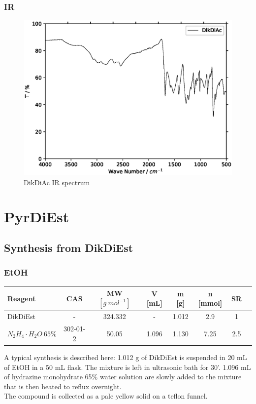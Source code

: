 \documentclass[../Master.tex]{subfiles}
\begin{document}
\newpage
\subsubsection{IR}

\begin{figure}[h!]
	\centering
	\includegraphics[width=12cm,keepaspectratio]{Spectra/ir/DikDiAc.eps}
	\caption{DikDiAc IR spectrum}
\end{figure}

\section{PyrDiEst}
\subsection{Synthesis from DikDiEst}
\subsubsection{EtOH}
\begin{center}
	\begin{tabular}[b]{lccccccc}
		\toprule
		Reagent                      & CAS      & MW \([g \ mol^{-1}]\) & V [mL] & m [g] & n [mmol] & SR  \\
		\midrule
		DikDiEst                     & -        & 324.332               & -      & 1.012 & 2.9      & 1   \\
		\(N_2H_4 \cdot H_2O \ 65\%\) & 302-01-2 & 50.05                 & 1.096  & 1.130 & 7.25     & 2.5 \\
		\bottomrule
	\end{tabular}
\end{center}
A typical synthesis is described here:
1.012 g of DikDiEst is suspended in 20 mL of EtOH in a 50 mL flask. The mixture is left in ultrasonic bath for 30'. 1.096 mL of hydrazine monohydrate 65\% water solution  are slowly added to the mixture that is then heated to reflux overnight.\\
The compound is collected as a pale yellow solid on a teflon funnel.
\newpage
\end{document}
